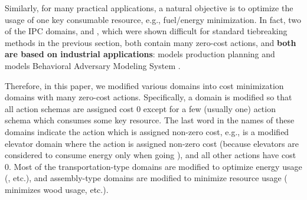 
Similarly, for many practical applications, a natural objective is to
optimize the usage of one key consumable resource, e.g., fuel/energy
minimization.  In fact, two of the IPC domains,  and
, which were shown difficult for standard tiebreaking
methods in the previous section, both contain many zero-cost actions,
and \textbf{both are based on industrial applications}:  models
production planning \cite{fink1999applications} and 
models Behavioral Adversary Modeling System \cite[minimizing decryption,
data transfer, etc.]{boddy2005course}.

Therefore, in this paper, we modified various domains
into cost minimization domains with many zero-cost actions.
Specifically, a domain is modified so that all action schemas are assigned
cost 0 except for a few (usually one) action schema which consumes some key resource.
The last word in the names of these domains indicate the action which is
assigned non-zero cost, e.g.,  is a modified elevator
domain where the  action is assigned non-zero cost (because
elevators are considered to consume energy only when going ), and all other actions have cost 0.
Most of the transportation-type domains are modified to optimize 
energy usage (,  etc.), and  assembly-type domains are modified to minimize resource usage
( minimizes wood usage, etc.).

